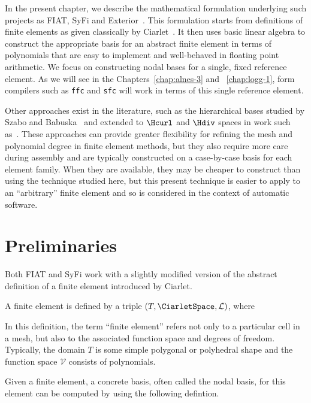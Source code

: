 In the present chapter, we describe the mathematical formulation
underlying such projects as FIAT, SyFi and Exterior~\citep{LoggMardal2009}.
This formulation starts from definitions of finite elements as
given classically by Ciarlet~\citep{Ciarlet2002}.  It then uses basic linear
algebra to construct the appropriate basis for an abstract
finite element in terms of polynomials that are easy to implement and
well-behaved in floating point arithmetic.  We focus on
constructing nodal bases for a single, fixed reference element.  As we
will see in the Chapters~\ref{chap:alnes-3} and ~\ref{chap:logg-1}, form compilers such as
\texttt{ffc} and \texttt{sfc} will work
in terms of this single reference element.


Other approaches exist in the literature, such as the hierarchical
bases studied by Szabo and Babuska~\citep{SzaboBabuska1991} and extended to \(
\Hcurl \) and \( \Hdiv \) spaces in work such
as~\citep{AinsworthCoyle2003}.  These approaches can provide greater flexibility for
refining the mesh and polynomial degree in finite element methods, but
they also require more care during assembly and are typically constructed
on a case-by-case basis for each element family.  When they are
available, they may be cheaper to construct than using the technique
studied here, but this present technique is easier to apply to an
``arbitrary'' finite element and so is considered in the context of
automatic software.


\section{Preliminaries}
Both FIAT and SyFi work with a slightly modified version of the  abstract definition of a finite element introduced by
Ciarlet.
\begin{definition}
  A finite element is defined by a triple
  $(T, \CiarletSpace,\mathcal{L})$, where
  \femdefinition{}
  \label{chap:kirby-1:fedef} 
\end{definition}
In this definition, the term ``finite element'' refers not only to
a particular cell in a  mesh, but also to the associated function
space and degrees of freedom.  Typically, the domain \( T \) is some
simple polygonal or polyhedral shape and the function space \( \mathcal{V} \)
consists of polynomials.

Given a finite element, a concrete
basis, often called the nodal basis,
for this element can be computed by using the following defintion.


